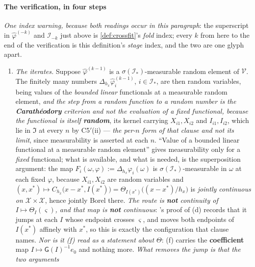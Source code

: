 \paragraph{The verification, in four steps}

\emph{One index warning, because both readings occur in this paragraph}: the
superscript in $\hat\varphi^{(-k)}$ and $\mathcal I_{-k}$ just above is \cref{def:crossfit}'s \emph{fold}
index; every $k$ from here to the end of the verification is this definition's \emph{stage} index, and the
two are one glyph apart.
\begin{enumerate}
\item[--] \emph{The iterates.} Suppose $\hat\varphi^{(k-1)}$ is a $\sigma(\mathcal I_\ast)$-measurable random
element of $\mathcal V$. The finitely many numbers $\Delta_{h_x}\hat\varphi^{(k-1)}_i$, $i\in\mathcal I_\ast$, are
then random variables, being values of the \emph{bounded linear} functionals  at a measurable
random element, \emph{and the step from a random function to a random number is the
\textbf{Carath\'eodory} criterion and not the evaluation of a fixed functional, because the functional
 is itself \textbf{random}}, its kernel carrying $X_{i1},X_{i2}$ and $I_{i1},I_{i2}$, which lie in $\mathfrak I$ at every $n$ by C5$'$(ii) --- \emph{the per-$n$ form of that clause and not its limit}, since measurability is asserted at each $n$.
``Value of a bounded linear functional at a measurable random element'' gives measurability only for a
\emph{fixed} functional; what is available, and what is needed, is the superposition argument: the map
$F_i(\omega,\varphi):=\Delta_{h_x}\varphi_i(\omega)$ is $\sigma(\mathcal I_\ast)$-measurable in $\omega$ at each
fixed $\varphi$, because $X_{i1},X_{i2}$ are random variables and
$(x,x^\ast)\mapsto C_{h_x}\big(x-x^\ast,I(x^\ast)\big)=\Theta_{I(x^\ast)}\big((x-x^\ast)/h_x\big)$ is
\emph{jointly continuous on $\mathcal X\times\mathcal X$}, hence jointly Borel there.
\emph{The route is \textbf{not} continuity of $I\mapsto\Theta_I(\varsigma)$, and that map is
\textbf{not} continuous}: 's proof of \textup{(d)} records that it jumps at
each $I$ whose endpoint crosses $\varsigma$, and  moves both endpoints of $I(x^\ast)$
affinely with $x^\ast$, so this is exactly the configuration that clause names. \emph{Nor is it
\textup{(f)} read as a statement about $\Theta$}: \textup{(f)} carries the \textbf{coefficient} map
$I\mapsto\mathsf G(I)^{-1}e_0$ and nothing more. \emph{What removes the jump is that the two arguments
}
\end{enumerate}
